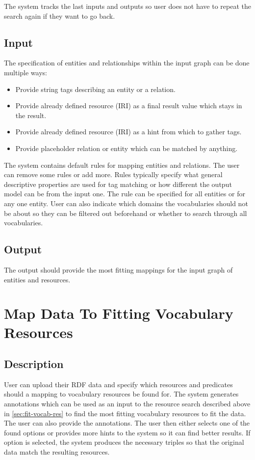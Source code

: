 The system tracks the last inputs and outputs so user does not have to repeat the search again if they want to go back. 

\subsection{Input}
The specification of entities and relationships within the input graph can be done multiple ways:
\begin{itemize}
    \item Provide string tags describing an entity or a relation.
    \item Provide already defined resource (IRI) as a final result value which stays in the result.
    \item Provide already defined resource (IRI) as a hint from which to gather tags.
    \item Provide placeholder relation or entity which can be matched by anything.
\end{itemize}

The system contains default rules for mapping entities and relations. The user can remove some rules or add more. Rules typically specify what general descriptive properties are used for tag matching or how different the output model can be from the input one. The rule can be specified for all entities or for any one entity. User can also indicate which domains the vocabularies should not be about so they can be filtered out beforehand or whether to search through all vocabularies.

\subsection{Output}
The output should provide the most fitting mappings for the input graph of entities and resources.

\section{Map Data To Fitting Vocabulary Resources}
\subsection{Description}
User can upload their RDF data and specify which resources and predicates should a mapping to vocabulary resources be found for. The system generates annotations which can be used as an input to the resource search described above in \autoref{sec:fit-vocab-res} to find the most fitting vocabulary resources to fit the data. The user can also provide the annotations. The user then either selects one of the found options or provides more hints to the system so it can find better results. If option is selected, the system produces the necessary triples so that the original data match the resulting resources.

